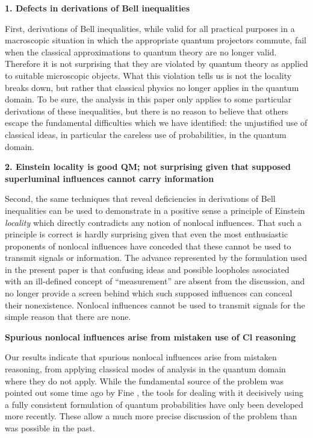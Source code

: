 \documentclass[12pt]{article} %
\def\outl#1{\par{\medskip\noindent\hspace*{.5cm}\bf
      \mathversion{bold}#1\mathversion{normal}\smallskip} }
\def\np{} \def\xa{} \def\xb{} \def\xn{} \def\xp{}
\def\outl#1{} \def\np{} \def\xa{} \def\xb{} \def\xn{} \def\xp{}
\def\outl#1{\par{\medskip\noindent\hspace*{.5cm}\bf
      \mathversion{bold}#1\mathversion{normal}\smallskip} }
\def\np{\newpage }\def\xn{\nopagebreak }\def\xp{\pagebreak }
\begin{document}
\xb
\outl{1. Defects in derivations of Bell inequalities}
\xa


First, derivations of Bell inequalities, while valid for all practical purposes
in a macroscopic situation in which the appropriate quantum projectors
commute, fail when the classical approximations to quantum theory are no
longer valid.  Therefore it is not surprising that they are violated by
quantum theory as applied to suitable microscopic objects.  What this
violation tells us is not the locality breaks down, but rather that classical
physics no longer applies in the quantum domain.  To be sure, the analysis in
this paper only applies to some particular derivations of these inequalities,
but there is no reason to believe that others escape the fundamental
difficulties which we have identified: the unjustified use of classical ideas,
in particular the careless use of probabilities, in the quantum domain.

\xb
\outl{2. Einstein locality is good QM; not surprising given that supposed
  superluminal influences cannot carry information}
\xa


Second, the same techniques that reveal deficiencies in derivations of Bell
inequalities can be used to demonstrate in a positive sense a principle of
Einstein \emph{locality} which directly contradicts any notion of nonlocal
influences.  That such a principle is correct is hardly surprising given that
even the most enthusiastic proponents of nonlocal influences have conceded
that these cannot be used to transmit signals or information.  The advance
represented by the formulation used in the present paper is that confusing
ideas and possible loopholes associated with an ill-defined concept of
``measurement''  are absent from the discussion, and no longer provide a
screen behind which such supposed influences can conceal their nonexistence.
Nonlocal influences cannot be used to transmit signals for the simple reason
that there are none.  

\xb
\outl{Spurious nonlocal influences arise from mistaken use of Cl reasoning}
\xa


Our results indicate that spurious nonlocal influences arise from mistaken
reasoning, from applying classical modes of analysis in the quantum domain
where they do not apply.  While the fundamental source of the problem was
pointed out some time ago by Fine \cite{Fne82}, the tools for dealing with it
decisively using a fully consistent formulation of quantum probabilities have
only been developed more recently. These allow a much more precise discussion
of the problem than was possible in the past. 
\end{document}
